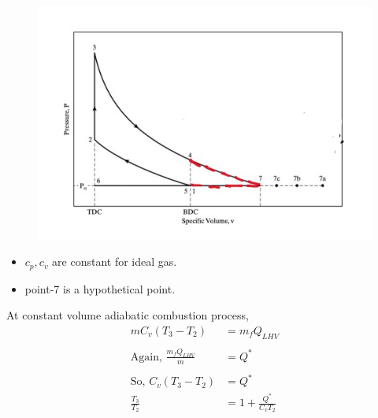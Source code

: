 \documentclass{article}
\begin{document}
\begin{multicols}{2}
		\begin{figure}[H]
			\begin{center}
				\includegraphics[width=\columnwidth]{img/const_vol_adia_comb_process.jpeg}
			\end{center}
		\end{figure}

		\begin{itemize}
			\item $c_p, c_v$ are constant for ideal gas.
			\item point-7 is a hypothetical point. 
		\end{itemize}

		At constant volume adiabatic combustion process,
		\begin{align*}
			mC_v(T_3-T_2) &= m_f Q_{LHV} \\
			&\\
			\text{Again, }\frac{m_f Q_{LHV}}{m} &= Q^* \\
			&\\
			\text{So, } C_v (T_3-T_2) &= Q^* \\
			\frac{T_3}{T_2} &= 1 + \frac{Q^*}{C_vT_2}
		\end{align*}
		\begin{center}
		  \end{center}


\end{multicols}
\end{document}
